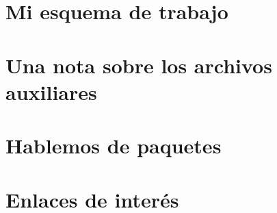 \documentclass[a4paper,10pt]{book}
\begin{document}
\chapter{Mi esquema de trabajo}


\appendix
\chapter{Una nota sobre los archivos auxiliares}


\chapter{Hablemos de paquetes}


\chapter{Enlaces de interés}


\backmatter
% 
%
\end{document}
